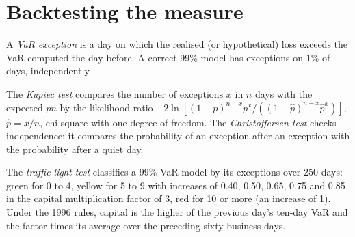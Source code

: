 \begin{omfigure}

\label{fig:rc:market-risk-measures:hist}
\end{omfigure}

\section{Backtesting the measure}

\begin{definition}\label{def:rc:market-risk-measures:exception}
A \emph{VaR exception} is a day on which the realised (or hypothetical)
loss exceeds the VaR computed the day before. A correct 99\% model has exceptions on 1\% of days,
independently.
\end{definition}

\begin{definition}\label{def:rc:market-risk-measures:tests}
The \emph{Kupiec test} compares the number of exceptions $x$ in $n$ days with
the expected $pn$ by the likelihood ratio $-2\ln[(1-p)^{n-x}p^x/((1-\hat p)^{n-x}\hat p^x)]$, $\hat p = x/n$,
chi-square with one degree of freedom. The \emph{Christoffersen test}
checks independence: it compares the probability of an exception after an exception with the
probability after a quiet day.
\end{definition}

\begin{definition}\label{def:rc:market-risk-measures:traffic}
The \emph{traffic-light test} classifies a 99\% VaR model by its
exceptions over 250 days: green for 0 to 4, yellow for 5 to 9 with increases of 0.40, 0.50,
0.65, 0.75 and 0.85 in the capital multiplication factor of 3, red for 10 or more (an increase
of 1). Under the 1996 rules, capital is the higher of the previous day's ten-day VaR and the factor times
its average over the preceding sixty business days.
\end{definition}

